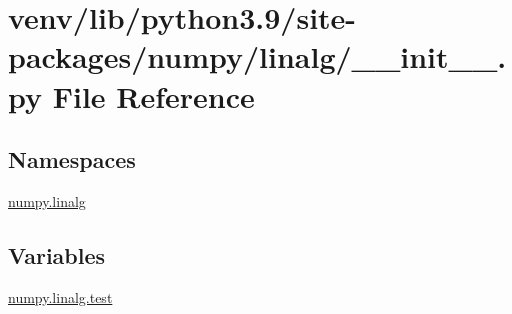 \hypertarget{venv_2lib_2python3_89_2site-packages_2numpy_2linalg_2____init_____8py}{}\section{venv/lib/python3.9/site-\/packages/numpy/linalg/\+\_\+\+\_\+init\+\_\+\+\_\+.py File Reference}
\label{venv_2lib_2python3_89_2site-packages_2numpy_2linalg_2____init_____8py}
\subsection*{Namespaces}
\begin{DoxyCompactItemize}
\item 
 \hyperlink{namespacenumpy_1_1linalg}{numpy.\+linalg}
\end{DoxyCompactItemize}
\subsection*{Variables}
\begin{DoxyCompactItemize}
\item 
\hyperlink{namespacenumpy_1_1linalg_ad3c8c6b67058d83f35678d387a965770}{numpy.\+linalg.\+test}
\end{DoxyCompactItemize}
